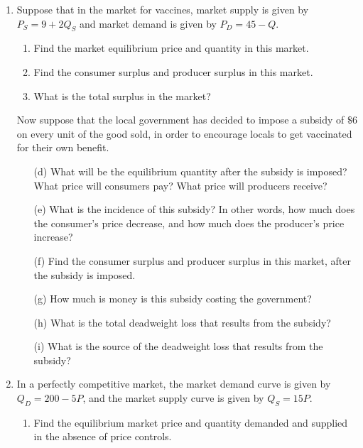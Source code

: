 \documentclass[11pt]{article}
\begin{document}
\begin{enumerate}
  \item Suppose that in the market for vaccines, market supply is given by $P_{S}=9+2 Q_{S}$ and market demand is given by $P_{D}=45-Q$. 
  \begin{enumerate}
    \item Find the market equilibrium price and quantity in this market.

    \item Find the consumer surplus and producer surplus in this market.

    \item What is the total surplus in the market?
  \end{enumerate}

  Now suppose that the local government has decided to impose a subsidy of $\$ 6$ on every unit of the good sold, in order to encourage locals to get vaccinated for their own benefit.
  
  \begin{enumerate}
    \item[(d)] What will be the equilibrium quantity after the subsidy is imposed? What price will consumers pay? What price will producers receive?

    \item[(e)] What is the incidence of this subsidy? In other words, how much does the consumer's price decrease, and how much does the producer's price increase?

    \item[(f)] Find the consumer surplus and producer surplus in this market, after the subsidy is imposed.

    \item[(g)] How much is money is this subsidy costing the government?

    \item[(h)] What is the total deadweight loss that results from the subsidy?

    \item[(i)] What is the source of the deadweight loss that results from the subsidy?
  \end{enumerate}

  \item In a perfectly competitive market, the market demand curve is given by $Q_D = 200 - 5P$, and the market supply curve is given by $Q_S = 15P$.

  \begin{enumerate}
    \item Find the equilibrium market price and quantity demanded and supplied in the absence of price controls.
    

\end{enumerate}
\end{enumerate}
\end{document}
